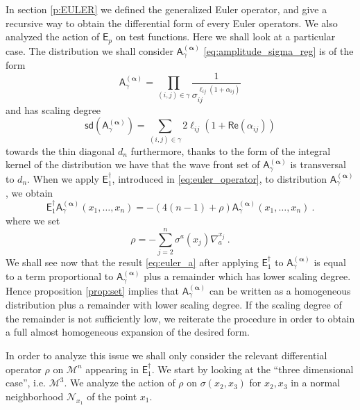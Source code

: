 \documentclass[11pt]{book}
\newcommand{\sd}{\mathsf{sd}}
\renewcommand{\Re}{\mathsf{Re}}
\newcommand{\alphabd}{\boldsymbol{\alpha}}
\newcommand{\Mcal}{\mathcal{M}}
\newcommand{\Ncal}{\mathcal{N}}
\newcommand{\Asf}{\mathsf{A}}
\newcommand{\Esf}{\mathsf{E}}
\theoremstyle{break}
\begin{document}
In section \ref{p:EULER} we defined the generalized Euler operator, and give a recursive way to obtain the differential form of every Euler operators. We also analyzed the action of $\Esf_p$ on test functions. Here we shall look at a particular case. The distribution we shall consider $\Asf^{(\alphabd)}_\gamma$ \eqref{eq:amplitude_sigma_reg} is of the form
%
\begin{equation*}
\Asf_\gamma^{(\alphabd)}=\prod_{(i,j)\in\gamma} \frac{1}{\sigma_{ij}^{\ell_{ij}(1+ \alpha_{ij})}} 
\end{equation*}
%
and has scaling degree 
%
\begin{equation*}
\sd(\Asf_\gamma^{(\alphabd)}) = \sum_{(i,j)\in\gamma} 2 \ell_{ij}\left(1+ \Re(\alpha_{ij})\right) 
\end{equation*}
%
towards the thin diagonal $d_n$ furthermore, thanks to the form of the integral kernel of the distribution we have that the wave front set of $\Asf_\gamma^{(\alphabd)}$ is transversal to $d_n$. When we apply $\Esf^\dagger_1$, introduced in \eqref{eq:euler_operator}, to distribution $\Asf_\gamma^{(\alphabd)}$, we obtain
%
\begin{equation}
\Esf_1^\dagger  \Asf_\gamma^{(\alphabd)}(x_1,\dots,x_n) = - \left( 4(n-1) + \rho \right) \Asf_\gamma^{(\alphabd)}(x_1,\dots,x_n) \ .
\label{eq:euler_a}
\end{equation}
%
where we set
%
\begin{equation}
\rho = - \sum_{j=2}^n \sigma^a(x_j) \nabla^{x_j}_a \ .    
\label{eq:rho}
\end{equation}
%
We shall see now that the result \eqref{eq:euler_a} after applying $\Esf_1^\dagger$ to $\Asf_\gamma^{(\alphabd)}$ is equal to a term proportional to $\Asf_\gamma^{(\alphabd)}$ plus a remainder which has lower scaling degree. Hence proposition \ref{prop:set} implies that $\Asf_\gamma^{(\alphabd)}$ can be written as a homogeneous distribution plus a remainder with lower scaling degree. If the scaling degree of the remainder is not sufficiently low, we reiterate the procedure in order to obtain a full almost homogeneous expansion of the desired form.


\bigskip


In order to analyze this issue we shall only consider the relevant differential operator $\rho$ on $\Mcal^n$ appearing in $\Esf_1^\dagger$. We start by looking at the ``three dimensional case'', i.e.  $\Mcal^3$. We analyze the action of $\rho$ on $\sigma(x_2,x_3)$ for $x_2,x_3$ in a normal neighborhood $\Ncal_{x_1}$ of the point $x_1$.
\end{document}
